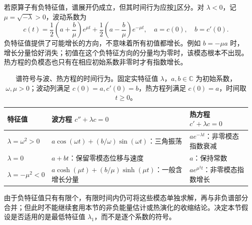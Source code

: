 \ProseParagraphBreak

若原算子有负特征值，谱展开仍成立，但其时间行为应按\cref{b2:tab:10-spectral-time-evolution}区分。对 \(\lambda<0\)，记 \(\mu=\sqrt{-\lambda}>0\)，波动系数为
\[
 c(t)=\frac12\left(a+\frac b\mu\right)e^{\mu t}
     +\frac12\left(a-\frac b\mu\right)e^{-\mu t},
 \quad a=c(0),\quad b=c'(0).
\]
负特征值提供了可能增长的方向，不意味着所有初值都增长。例如 \(b=-\mu a\) 时，增长分量恰好消失；初值在这个负特征方向的分量均为零时，该模态根本不出现。热方程的负模态也只有在相应初始系数非零时才有指数增长。

\begin{table}[htbp]
\centering
\small
\setlength{\tabcolsep}{5pt}
\caption[谱符号与波、热方程的时间行为]{谱符号与波、热方程的时间行为。固定实特征值 \(\lambda\)，\(a,b\in\mathbb C\) 为初始系数，\mbox{\(\omega,\mu>0\)}；波动列满足 \(c(0)=a,c'(0)=b\)，热方程列满足 \(c(0)=a\)，时间取 \(t\geq0\)。}
\label{b2:tab:10-spectral-time-evolution}
\begin{tabularx}{\linewidth}{@{}>{\raggedright\arraybackslash}p{2.5cm}>{\raggedright\arraybackslash}X>{\raggedright\arraybackslash}p{2.9cm}@{}}
\toprule
特征值 & 波方程 \(c''+\lambda c=0\) & 热方程 \(c'+\lambda c=0\) \\
\midrule
\(\lambda=\omega^2>0\) & \(a\cos(\omega t)+(b/\omega)\sin(\omega t)\)：三角振荡 & \(ae^{-\lambda t}\)：非零模态指数衰减 \\
\(\lambda=0\) & \(a+bt\)：保留零模态位移与速度 & \(a\)：保持常数 \\
\(\lambda=-\mu^2<0\) & \(a\cosh(\mu t)+(b/\mu)\sinh(\mu t)\)：一般含增长分量 & \(ae^{\mu^2t}\)：非零模态指数增长 \\
\bottomrule
\end{tabularx}
\end{table}

由于负特征值只有有限个，有限时间内仍可将这些模态单独求解，再与非负谱部分合并；但此时不能继续套用本节的非负能量估计或热演化的收缩结论。决定本节假设是否适用的是最低特征值 \(\lambda_1\)，而不是逐个系数的符号。
